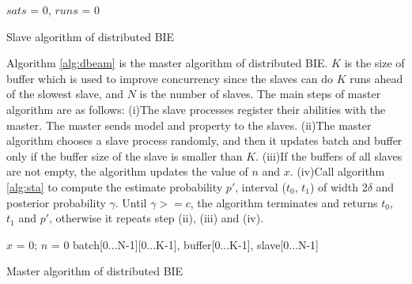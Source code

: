 \begin{algorithm}[t]
{}
$sats$ = 0, $runs$ = 0\;
\caption{Slave algorithm of distributed BIE}
\label{alg:dbeas}
\end{algorithm}
Algorithm \ref{alg:dbeam} is the master algorithm of distributed BIE. \emph{$K$} is the size of buffer which is used to improve concurrency since the slaves can do \emph{$K$} runs ahead of the slowest slave, and \emph{$N$} is the number of slaves. The main steps of master algorithm are as follows: (i)The slave processes register their abilities with the master. The master sends model and property to the slaves. (ii)The master algorithm chooses a slave process randomly, and then it updates batch and buffer only if the buffer size of the slave is smaller than \emph{$K$}. (iii)If the buffers of all slaves are not empty, the algorithm updates the value of \emph{$n$} and \emph{$x$}. (iv)Call algorithm \ref{alg:sta} to compute the estimate probability $p'$, interval ($t_0$, $t_1$) of width 2$\delta$ and posterior probability $\gamma$. Until $\gamma >= c$, the algorithm terminates and returns $t_0$, $t_1$ and $p'$, otherwise it repeats step (ii), (iii) and (iv).
\begin{algorithm}[t]
{}
$x$ = 0; $n$ = 0\;
batch[0...N-1][0...K-1], buffer[0...K-1], slave[0...N-1]\;
\caption{Master algorithm of distributed BIE}
\label{alg:dbeam}
\end{algorithm}
